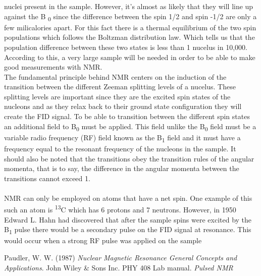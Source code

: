 \documentclass{article}
\begin{document}
{\begin{multicols}{2}
nuclei present in the sample\cite{ref:1}.
However, it's almost as likely that they will line up against the B
\textsubscript{0} since the difference between the spin 1/2 and spin -1/2 are 
only a few milicalories apart. For this fact there is a thermal equilibrium of 
the two spin populations which follows the Boltzman distribution law. Which 
tells us that the population difference between these two states is less than 
1 nucelus in 10,000. According to this, a very large sample will be needed in 
order to be able to make good measurements with NMR\cite{ref:1}.
\\
The fundamental principle behind NMR centers on the induction of the transition 
between the different Zeeman splitting levels of a nucelus. These splitting 
levels are important since they are the excited spin states of the nucleons and 
as they relax back to their ground state configuration they will create the 
FID signal. To be able to transition between the different spin states an 
additional field to B\textsubscript{0} must be applied. This field unlike the 
B\textsubscript{0} field must be a variable radio frequency (RF) field known as 
the B\textsubscript{1} field and it must have a frequency equal to the resonant 
frequency of the nucleons in the sample. It should also be noted that the 
transitions obey the transition rules of the angular momenta, that is to say, 
the difference in the angular momenta between the transitions cannot exceed 1.
\\
\\
NMR can only be employed on atoms that have a net spin. One example of this 
such an atom is \textsuperscript{13}C which has 6 protons and 7 neutrons. 
However, in 1950 Edward L. Hahn had discovered that after the sample spins were 
excited by the B\textsubscript{1} pulse there would be a secondary pulse on the 
FID signal at resonance. This would occur when a strong RF pulse was applied on 
the sample 
\begin{thebibliography}{9}
Paudler, W. W. (1987) \emph{Nuclear Magnetic Resonance General 
Concepts and Applications}. John Wiley \& Sons Inc.
PHY 408 Lab manual. \emph{Pulsed NMR}
\end{thebibliography}
\end{multicols}
}
\end{document}
